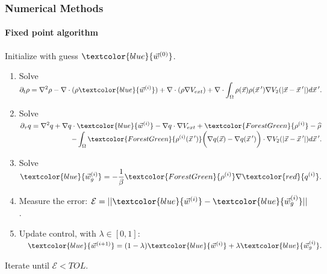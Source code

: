 \documentclass[aspectratio=169,xcolor=dvipsnames]{beamer}
\begin{document}
\begin{frame}
	\frametitle{Numerical Methods}
\framesubtitle{Fixed point algorithm}
\vspace{0.2 cm}
Initialize with guess $\textcolor{blue}{\vec{w}^{(0)}}$.
	\begin{enumerate}
     \item 
     Solve 
     	$ \displaystyle\partial_t \rho  = \nabla^2 \rho  - \nabla \cdot (\rho \textcolor{blue}{\vec{w}^{(i)}} ) + \nabla \cdot \left( \rho \nabla V_{ext} \right)
     	+ \nabla \cdot \int_\Omega \rho(\vec{x}) \rho(\vec{x}\hspace{0.2em}') \nabla V_2(|\vec{x}-\vec{x}\hspace{0.2em}'|)d\vec{x}\hspace{0.2em}'.$
	 \item
     Solve 
     	$\partial_{{\tau}} q  = \displaystyle \nabla^2 q  + \nabla q  \cdot \textcolor{blue}{\vec{w}^{(i)}} - \nabla q \cdot \nabla V_{ext} + \textcolor{ForestGreen}{\rho^{(i)}}  - \widehat \rho$\\
     	$\displaystyle \qquad \qquad \qquad \quad \ - \int_\Omega \textcolor{ForestGreen}{\rho^{(i)}(\vec{x}\hspace{0.2em}')} \bigg(\nabla q( \vec{x} ) - \nabla q( \vec{x}\hspace{0.2em}')\bigg) \cdot \nabla V_2(|\vec{x}-\vec{x}\hspace{0.2em}'|)d\vec{x}\hspace{0.2em}'. $
     \item Solve $\displaystyle \textcolor{blue}{\vec{w}^{(i)}_g} = - \frac{1}{\beta}\textcolor{ForestGreen}{{\rho}^{(i)}} \nabla \textcolor{red}{{q}^{(i)}}.$\\
     \item Measure the error: $ \mathcal{E} = ||\textcolor{blue}{\vec{w}^{(i)}} - \textcolor{blue}{\vec{w}^{(i)}_g}||$.
     \vspace{0.2 cm}
	 \item Update control, with $\lambda \in [0,1]$:       $\quad \textcolor{blue}{\vec{w}^{(i+1)}} = (1-\lambda)\textcolor{blue}{\vec{w}^{(i)}} + \lambda \textcolor{blue}{\vec{w}^{(i)}_g}.$	 
	\end{enumerate}	
\vspace{0.2 cm}
Iterate until $\mathcal{E} <TOL$.
\end{frame}
\end{document}
